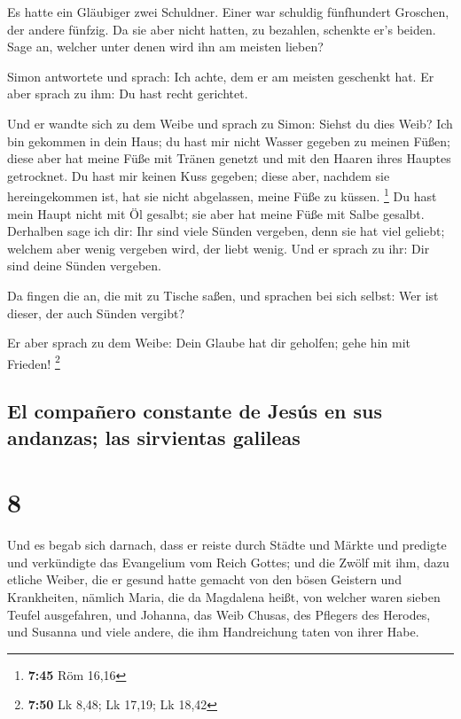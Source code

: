  Es hatte ein Gläubiger zwei Schuldner. Einer war
schuldig fünfhundert Groschen, der andere fünfzig.  Da
sie aber nicht hatten, zu bezahlen, schenkte er's beiden. Sage an,
welcher unter denen wird ihn am meisten lieben?

 Simon antwortete und sprach: Ich achte, dem er am
meisten geschenkt hat. Er aber sprach zu ihm: Du hast recht gerichtet.

 Und er wandte sich zu dem Weibe und sprach zu Simon:
Siehst du dies Weib? Ich bin gekommen in dein Haus; du hast mir nicht
Wasser gegeben zu meinen Füßen; diese aber hat meine Füße mit Tränen
genetzt und mit den Haaren ihres Hauptes getrocknet.  Du
hast mir keinen Kuss gegeben; diese aber, nachdem sie hereingekommen
ist, hat sie nicht abgelassen, meine Füße zu küssen. \footnote{\textbf{7:45}
  Röm 16,16}  Du hast mein Haupt nicht mit Öl gesalbt;
sie aber hat meine Füße mit Salbe gesalbt.  Derhalben
sage ich dir: Ihr sind viele Sünden vergeben, denn sie hat viel geliebt;
welchem aber wenig vergeben wird, der liebt wenig.  Und
er sprach zu ihr: Dir sind deine Sünden vergeben.

 Da fingen die an, die mit zu Tische saßen, und sprachen
bei sich selbst: Wer ist dieser, der auch Sünden vergibt?

 Er aber sprach zu dem Weibe: Dein Glaube hat dir
geholfen; gehe hin mit Frieden! \footnote{\textbf{7:50} Lk 8,48; Lk
  17,19; Lk 18,42}

\hypertarget{el-compauxf1ero-constante-de-jesuxfas-en-sus-andanzas-las-sirvientas-galileas}{%
\subsection{El compañero constante de Jesús en sus andanzas; las
sirvientas
galileas}\label{el-compauxf1ero-constante-de-jesuxfas-en-sus-andanzas-las-sirvientas-galileas}}

\hypertarget{section-7}{%
\section{8}\label{section-7}}

 Und es begab sich darnach, dass er reiste durch Städte
und Märkte und predigte und verkündigte das Evangelium vom Reich Gottes;
und die Zwölf mit ihm,  dazu etliche Weiber, die er gesund
hatte gemacht von den bösen Geistern und Krankheiten, nämlich Maria, die
da Magdalena heißt, von welcher waren sieben Teufel ausgefahren,
 und Johanna, das Weib Chusas, des Pflegers des Herodes,
und Susanna und viele andere, die ihm Handreichung taten von ihrer Habe.

